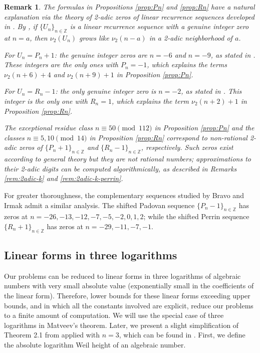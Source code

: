 \documentclass[11pt,a4paper]{article}
\newtheorem{remark}[theorem]{Remark}
\numberwithin{equation}{section}
\numberwithin{table}{section}
\numberwithin{figure}{section}
\begin{document}
\begin{remark}\label{rem:2adic-zeros}
The formulas in Propositions \ref{prop:Pn} and \ref{prop:Rn} have a natural explanation via the theory of 2-adic zeros of linear recurrence sequences developed in \cite{BiluLuca2025}. By \cite[Theorem 1.1]{BiluLuca2025}, if $\{U_n\}_{n\in\mathbb{Z}}$ is a linear recurrence sequence with a genuine integer zero at $n=a$, then $\nu_2(U_n)$ grows like $\nu_2(n-a)$ in a 2-adic neighborhood of $a$.
	
For $U_n = P_n+1$: the genuine integer zeros are $n=-6$ and $n=-9$, as stated in \cite[Theorem~2.3]{Bravo2023}. These integers are the only ones with $P_n=-1$, which explains the terms $\nu_2(n+6)+4$ and $\nu_2(n+9)+1$ in Proposition \ref{prop:Pn}.
	
For $U_n = R_n-1$: the only genuine integer zero is $n=-2$, as stated in \cite[Theorem~2.2]{Bravo2023}. This integer is the only one with $R_{n}=1$, which explains the term $\nu_2(n+2)+1$ in Proposition \ref{prop:Rn}.
	
The exceptional residue class $n\equiv 50\pmod{112}$ in Proposition \ref{prop:Pn} and the classes $n\equiv 5,10\pmod{14}$ in Proposition \ref{prop:Rn} correspond to \emph{non-rational} 2-adic zeros of $\{P_n+1\}_{n\in \mathbb{Z}}$ and $\{R_n-1\}_{n\in \mathbb{Z}}$, respectively. Such zeros exist according to general theory but they are not rational numbers; approximations to their 2-adic digits can be computed algorithmically, as described in Remarks \ref{rem:2adic-k} and \ref{rem:2adic-k-perrin}.
\end{remark}

For greater thoroughness, the complementary sequences studied by Bravo and Irmak \cite{BrIrmak} admit a similar analysis. The shifted Padovan sequence $\{P_n-1\}_{n\in \mathbb{Z}}$ has zeros at $n=-26,-13,-12,-7,-5,-2,0,1,2$; while the shifted Perrin sequence $\{R_n+1\}_{n\in \mathbb{Z}}$ has zeros at $n=-29,-11,-7,-1$.

\subsection{Linear forms in three logarithms}

Our problems can be reduced to linear forms in three logarithms of algebraic numbers with very small absolute value (exponentially small in the coefficients of the linear form). Therefore, lower bounds for these linear forms exceeding upper bounds, and in which all the constants involved are explicit, reduce our problems to a finite amount of computation. We will use the special case of three logarithms in Matveev's theorem. Later, we present a slight simplification of Theorem 2.1 from \cite{M} applied with $n=3$, which can be found in \cite{MV}. First, we define the absolute logarithm Weil height of an algebraic number.
\end{document}
